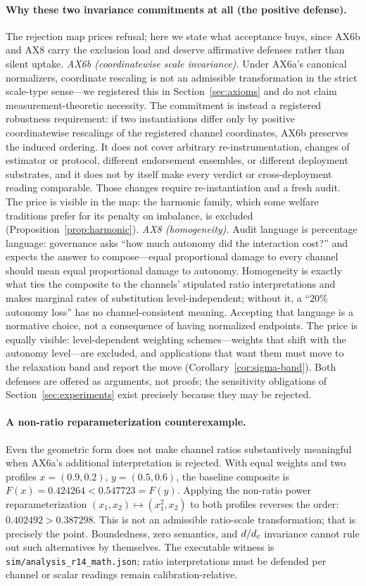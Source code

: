 \paragraph{Why these two invariance commitments at all (the positive defense).}
The rejection map prices refusal; here we state what acceptance buys, since
AX6b and AX8 carry the exclusion load and deserve affirmative defenses rather
than silent uptake. \emph{AX6b (coordinatewise scale invariance).} Under
AX6a's canonical normalizers, coordinate rescaling is not an admissible
transformation in the strict scale-type sense---we registered this in
Section~\ref{sec:axioms} and do not claim measurement-theoretic necessity.
The commitment is instead a registered robustness requirement: if two
instantiations differ only by positive coordinatewise rescalings of the
registered channel coordinates, AX6b preserves the induced ordering. It does
not cover arbitrary re-instrumentation, changes of estimator or protocol,
different endorsement ensembles, or different deployment substrates, and it
does not by itself make every verdict or cross-deployment reading comparable.
Those changes require re-instantiation and a fresh audit. The price is visible
in the map: the harmonic family,
which some welfare traditions prefer for its penalty on imbalance, is
excluded (Proposition~\ref{prop:harmonic}). \emph{AX8 (homogeneity).} Audit
language is percentage language: governance asks ``how much autonomy did the
interaction cost?'' and expects the answer to compose---equal proportional
damage to every channel should mean equal proportional damage to autonomy.
Homogeneity is exactly what ties the composite to the channels'
stipulated ratio interpretations and makes marginal rates of substitution
level-independent; without it, a ``$20\%$ autonomy loss'' has no
channel-consistent meaning. Accepting that language is a normative choice,
not a consequence of having normalized endpoints. The price is equally visible: level-dependent
weighting schemes---weights that shift with the autonomy level---are
excluded, and applications that want them must move to the relaxation band
and report the move (Corollary~\ref{cor:sigma-band}). Both defenses are
offered as arguments, not proofs; the sensitivity obligations of
Section~\ref{sec:experiments} exist precisely because they may be rejected.

\paragraph{A non-ratio reparameterization counterexample.}
Even the geometric form does not make channel ratios substantively meaningful
when AX6a's additional interpretation is rejected. With equal weights and two
profiles $x=(0.9,0.2)$, $y=(0.5,0.6)$, the baseline composite is
$F(x)=0.424264<0.547723=F(y)$. Applying the non-ratio power reparameterization
$(x_1,x_2)\mapsto(x_1^2,x_2)$ to both profiles reverses the order:
$0.402492>0.387298$. This is not an admissible ratio-scale transformation;
that is precisely the point. Boundedness, zero semantics, and $d/d_{c}$
invariance cannot rule out such alternatives by themselves. The executable
witness is \texttt{sim/analysis\_r14\_math.json}; ratio interpretations must
be defended per channel or scalar readings remain calibration-relative.


